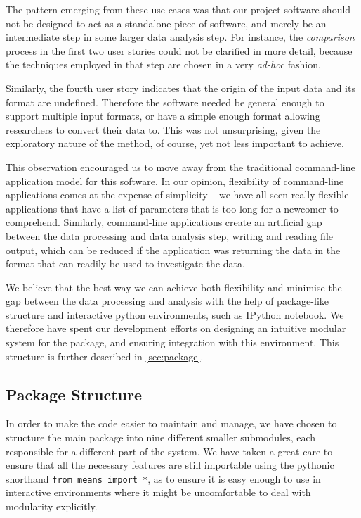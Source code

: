 The pattern emerging from these use cases was that our project software should not be designed to act as a standalone piece of software, and merely be an intermediate step in some larger data analysis step.
For instance, the \emph{comparison} process in the first two user stories could not be clarified in more detail, because the techniques employed in that step are chosen in a very \emph{ad-hoc} fashion.

Similarly, the fourth user story indicates that the origin of the input data and its format are undefined.
Therefore the software needed be general enough to support multiple input formats, or have a simple enough format allowing researchers to convert their data to.
This was not unsurprising, given the exploratory nature of the method, of course, yet not less important to achieve.

This observation encouraged us to move away from the traditional command-line application model for this software.
In our opinion, flexibility of command-line applications comes at the expense of simplicity -- we have all seen really flexible applications that have a list of parameters that is too long for a newcomer to comprehend.
Similarly, command-line applications create an artificial gap between the data processing and data analysis step, \ie{} writing and reading file output, which can be reduced if the application was returning the data in the format that can readily be used to investigate the data.

We believe that the best way we can achieve both flexibility and minimise the gap between the data processing and analysis with the help of package-like structure and interactive python environments, such as IPython notebook.
We therefore have spent our development efforts on designing an intuitive modular system for the package, and ensuring integration with this environment. This structure is further described in \autoref{sec:package}.

\subsection{Package Structure}
\label{sec:package}

In order to make the code easier to maintain and manage, we have chosen to structure the main \means  package into nine different smaller submodules, each responsible for a different part of the system. We have taken a great care to ensure that all the necessary features are still importable using the pythonic shorthand \verb"from means import *", as to ensure it is easy enough to use in interactive environments where it might be uncomfortable to deal with modularity explicitly.

